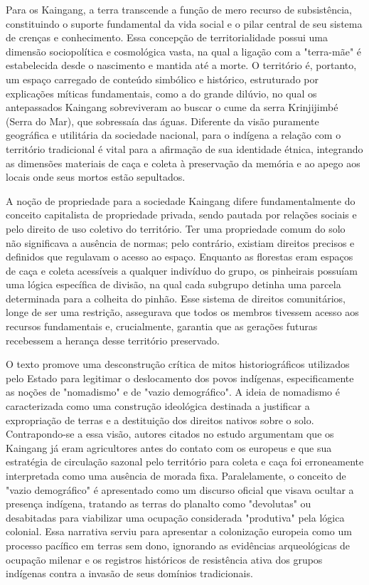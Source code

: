 \documentclass[12pt, a4paper]{article}
\begin{document}
Para os Kaingang, a terra transcende a função de mero recurso de subsistência, constituindo o suporte fundamental da vida social e o pilar central de seu sistema de crenças e conhecimento. Essa concepção de territorialidade possui uma dimensão sociopolítica e cosmológica vasta, na qual a ligação com a "terra-mãe" é estabelecida desde o nascimento e mantida até a morte. O território é, portanto, um espaço carregado de conteúdo simbólico e histórico, estruturado por explicações míticas fundamentais, como a do grande dilúvio, no qual os antepassados Kaingang sobreviveram ao buscar o cume da serra Krinjijimbé (Serra do Mar), que sobressaía das águas. Diferente da visão puramente geográfica e utilitária da sociedade nacional, para o indígena a relação com o território tradicional é vital para a afirmação de sua identidade étnica, integrando as dimensões materiais de caça e coleta à preservação da memória e ao apego aos locais onde seus mortos estão sepultados.

A noção de propriedade para a sociedade Kaingang difere fundamentalmente do conceito capitalista de propriedade privada, sendo pautada por relações sociais e pelo direito de uso coletivo do território. Ter uma propriedade comum do solo não significava a ausência de normas; pelo contrário, existiam direitos precisos e definidos que regulavam o acesso ao espaço. Enquanto as florestas eram espaços de caça e coleta acessíveis a qualquer indivíduo do grupo, os pinheirais possuíam uma lógica específica de divisão, na qual cada subgrupo detinha uma parcela determinada para a colheita do pinhão. Esse sistema de direitos comunitários, longe de ser uma restrição, assegurava que todos os membros tivessem acesso aos recursos fundamentais e, crucialmente, garantia que as gerações futuras recebessem a herança desse território preservado.

O texto promove uma desconstrução crítica de mitos historiográficos utilizados pelo Estado para legitimar o deslocamento dos povos indígenas, especificamente as noções de "nomadismo" e de "vazio demográfico". A ideia de nomadismo é caracterizada como uma construção ideológica destinada a justificar a expropriação de terras e a destituição dos direitos nativos sobre o solo. Contrapondo-se a essa visão, autores citados no estudo argumentam que os Kaingang já eram agricultores antes do contato com os europeus e que sua estratégia de circulação sazonal pelo território para coleta e caça foi erroneamente interpretada como uma ausência de morada fixa. Paralelamente, o conceito de "vazio demográfico" é apresentado como um discurso oficial que visava ocultar a presença indígena, tratando as terras do planalto como "devolutas" ou desabitadas para viabilizar uma ocupação considerada "produtiva" pela lógica colonial. Essa narrativa serviu para apresentar a colonização europeia como um processo pacífico em terras sem dono, ignorando as evidências arqueológicas de ocupação milenar e os registros históricos de resistência ativa dos grupos indígenas contra a invasão de seus domínios tradicionais.
\end{document}
